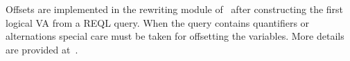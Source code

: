 Offsets are implemented in the rewriting module of \rematch\ after constructing the first logical VA from a REQL query. When the query contains quantifiers or alternations special care must be taken for offsetting the variables. More details are provided at~\cite{REPO}.





